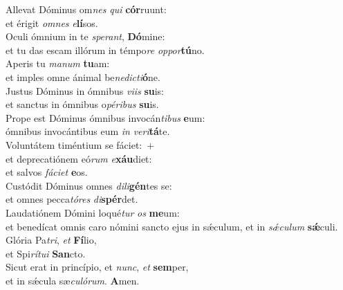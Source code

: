 \evenverse Allevat Dóminus om\textit{nes} \textit{qui} \textbf{cór}ruunt:~\*\\
\evenverse et érigit \textit{om}\textit{nes} \textit{e}\textbf{lí}sos.\\
\oddverse Oculi ómnium in te \textit{spe}\textit{rant}, \textbf{Dó}mine:~\*\\
\oddverse et tu das escam illórum in témpo\textit{re} \textit{op}\textit{por}\textbf{tú}no.\\
\evenverse Aperis tu \textit{ma}\textit{num} \textbf{tu}am:~\*\\
\evenverse et imples omne ánimal be\textit{ne}\textit{di}\textit{cti}\textbf{ó}ne.\\
\oddverse Justus Dóminus in ómnibus \textit{vi}\textit{is} \textbf{su}is:~\*\\
\oddverse et sanctus in ómnibus o\textit{pé}\textit{ri}\textit{bus} \textbf{su}is.\\
\evenverse Prope est Dóminus ómnibus invocán\textit{ti}\textit{bus} \textbf{e}um:~\*\\
\evenverse ómnibus invocántibus eum \textit{in} \textit{ve}\textit{ri}\textbf{tá}te.\\
\oddverse Voluntátem timéntium se fáciet:~+\\
\oddverse  et deprecatiónem eó\textit{rum} \textit{e}\textbf{xáu}diet:~\*\\
\oddverse et salvos \textit{fá}\textit{ci}\textit{et} \textbf{e}os.\\
\evenverse Custódit Dóminus omnes \textit{di}\textit{li}\textbf{gén}tes se:~\*\\
\evenverse et omnes pecca\textit{tó}\textit{res} \textit{di}\textbf{spér}det.\\
\oddverse Laudatiónem Dómini loqué\textit{tur} \textit{os} \textbf{me}um:~\*\\
\oddverse et benedícat omnis caro nómini sancto ejus in sǽculum, et in \textit{sǽ}\textit{cu}\textit{lum} \textbf{sǽ}culi.\\
\evenverse Glória Pa\textit{tri}, \textit{et} \textbf{Fí}lio,~\*\\
\evenverse et Spi\textit{rí}\textit{tu}\textit{i} \textbf{San}cto.\\
\oddverse Sicut erat in princípio, et \textit{nunc}, \textit{et} \textbf{sem}per,~\*\\
\oddverse et in sǽcula sæ\textit{cu}\textit{ló}\textit{rum}. \textbf{A}men.\\
